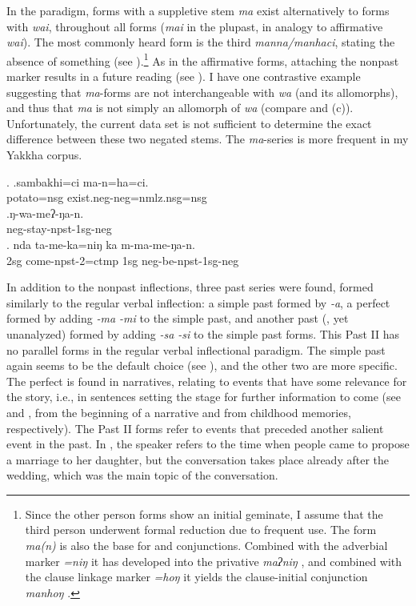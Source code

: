 In the  paradigm, forms with a suppletive stem  \emph{ma} exist alternatively to forms with \emph{wai}, throughout all  forms (\emph{mai} in the plupast, in analogy to affirmative \emph{wai}). The most commonly heard form is the third  \emph{manna/man\-ha\-ci}, stating the absence of something (see \Next[a]).\footnote{Since the other person forms show an initial geminate, I assume that the third person underwent formal reduction due to frequent use. The form \emph{ma(n)} is also the base for  and conjunctions. Combined with the adverbial  marker \emph{=niŋ} it has  developed into the privative  \emph{maʔniŋ} , and combined with the clause linkage marker  \emph{=hoŋ} it yields  the clause-initial conjunction \emph{manhoŋ} .} As in the affirmative forms, attaching the nonpast marker results in a future reading (see  \Next[c]). I have one contrastive example suggesting that \emph{ma}-forms are not interchangeable with \emph{wa} (and its allomorphs), and thus that \emph{ma} is not simply an allomorph of \emph{wa} (compare \Next[b] and (c)). Unfortunately, the current data set is not sufficient to determine the exact difference between these two negated stems. The \emph{ma}-series is more frequent in my Yakkha corpus. 

\ex. \ag.sambakhi=ci ma-n=ha=ci.\\
potato{\sc =nsg} exist{\sc .neg-neg=nmlz.nsg=nsg}\\
\bg.ŋ-wa-meʔ-ŋa-n.\\
{\sc neg-}stay{\sc -npst-1sg-neg}\\
\bg.      nda ta-me-ka=niŋ ka m-ma-me-ŋa-n.\\
{\sc 2sg} come{\sc -npst-2=ctmp} {\sc 1sg} {\sc neg-}be{\sc -npst-1sg-neg}\\


In addition to the nonpast inflections, three past series were found, formed similarly to the regular verbal inflection: a simple past formed by \emph{-a},  a perfect formed by adding \emph{-ma \ti -mi} to the simple past, and another past  (, yet unanalyzed) formed by adding \emph{-sa \ti -si} to the simple past forms. This Past II  has no parallel forms in the regular verbal inflectional paradigm.  The simple past again seems to be the default choice (see \Next[a]), and the other two are more specific. The perfect is found in narratives, relating to events that have some relevance for the story, i.e., in sentences setting the stage for further information to come (see \Next[b] and \Next[c], from the beginning of a narrative and from childhood memories, respectively). The Past II forms refer to events that preceded another salient event in the past. In \Next[d], the speaker  refers to the time when people came to propose a marriage to her daughter, but the conversation  takes place already after the wedding, which was the main topic of the conversation. 

